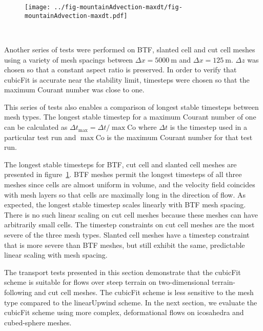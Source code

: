 \begin{figure}
	\centering
	\texttt{[image: ../fig-mountainAdvection-maxdt/fig-mountainAdvection-maxdt.pdf]}
	\caption{\\
	}
	\label{fig:mountainAdvection-maxdt}
\end{figure}

Another series of tests were performed on BTF, slanted cell and cut cell meshes using a variety of mesh spacings between $\Delta x = \SI{5000}{\meter}$ and $\Delta x = \SI{125}{\meter}$.  $\Delta z$ was chosen so that a constant aspect ratio is preserved.  In order to verify that cubicFit is accurate near the stability limit, timesteps were chosen so that the maximum Courant number was close to one.  

This series of tests also enables a comparison of longest stable timesteps between mesh types.  The longest stable timestep for a maximum Courant number of one can be calculated as $\Delta t_\mathrm{max} = \Delta t / \max{\mathrm{Co}}$ where $\Delta t$ is the timestep used in a particular test run and $\max{\mathrm{Co}}$ is the maximum Courant number for that test run.

The longest stable timesteps for BTF, cut cell and slanted cell meshes are presented in figure~\ref{fig:mountainAdvection-maxdt}.  BTF meshes permit the longest timesteps of all three meshes since cells are almost uniform in volume, and the velocity field coincides with mesh layers so that cells are maximally long in the direction of flow.  As expected, the longest stable timestep scales linearly with BTF mesh spacing.
There is no such linear scaling on cut cell meshes because these meshes can have arbitrarily small cells.  The timestep constraints on cut cell meshes are the most severe of the three mesh types.  Slanted cell meshes have a timestep constraint that is more severe than BTF meshes, but still exhibit the same, predictable linear scaling with mesh spacing.

The transport tests presented in this section demonstrate that the cubicFit scheme is suitable for flows over steep terrain on two-dimensional terrain-following and cut cell meshes.  The cubicFit scheme is less sensitive to the mesh type compared to the linearUpwind scheme.  In the next section, we evaluate the cubicFit scheme using more complex, deformational flows on icosahedra and cubed-sphere meshes.

